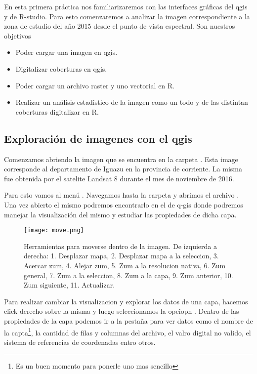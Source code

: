 En esta primera práctica nos familiarizaremos con las interfaces gráficas del
qgis y de R-studio. Para esto comenzaremos a analizar la imagen correspondiente
a la zona de estudio del año 2015 desde el punto de vista espectral. Son
nuestros objetivos

\begin{itemize}
    \item Poder cargar una imagen en qgis.
    \item Digitalizar coberturas en qgis.
    \item Poder cargar un archivo raster y uno vectorial en R.
    \item Realizar un análisis estadistico de la imagen como un todo y de las
        distintan coberturas digitalizar en R.
\end{itemize}
\subsection{Exploración de imagenes con el qgis}

Comenzamos abriendo la imagen  que se encuentra
en la carpeta . Esta image  corresponde al 
departamento de Iguazu en la provincia de corriente. La misma fue obtenida por 
el satelite Landsat 8 durante el mes de noviembre de 2016.
 
Para esto vamos al menú . Navegamos 
hasta la carpeta  y abrimos el archivo
. Una vez abierto el mismo podremos encontrarlo
en el  de q-gis donde podremos manejar la visualización del
mismo y estudiar las propiedades de dicha capa.

\begin{figure}[htb]
\begin{center}
    \texttt{[image: move.png]}
\end{center}
\caption{Herramientas para moverse dentro de la imagen. De izquierda a derecha:
    1. Desplazar mapa, 2. Desplazar mapa a la seleccion, 3. Acercar zum, 4.
    Alejar zum, 5. Zum a la resolucion nativa, 6. Zum general, 7. Zum a la
    seleccion, 8. Zum a la capa, 9. Zum anterior, 10. Zum siguiente, 11.
    Actualizar.}
\label{fig:move}
\end{figure}

Para realizar cambiar la visualizacion y explorar los datos de una capa, hacemos
click derecho sobre la misma y luego seleccionamos la opciopn
. Dentro de las propiedades de la capa podemos ir a la pestaña
 para ver datos como el nombre de la capta\footnote{Es un buen
momento para ponerle uno mas sencillo}, la cantidad de filas y columnas del
archivo, el valro digital no valido, el sistema de referencias de coordenadas
entro otros. 

